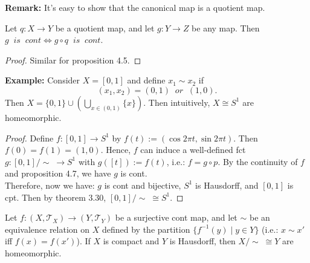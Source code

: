 \noindent\textbf{Remark:} It's easy to show that the canonical map is a quotient map.

\begin{proposition}
    Let $q: X \rightarrow Y$ be a quotient map, and let $g: Y \rightarrow Z$ be any map. Then
    $g \;\; is\;\; cont \Leftrightarrow g\circ q \;\; is \;\; cont.$
\end{proposition}

\begin{proof}
    Similar for proposition 4.5.
\end{proof}

\noindent\textbf{Example:} Consider $X = [0,1]$ and define $x_1\sim x_2$ if
$$(x_1,x_2) = (0,1) \;\; or \;\; (1,0).$$
Then $X= \{0,1\} \cup (\bigcup _{x\in (0,1)} \{ x\})$. Then intuitively, $X \cong S^1$ are homeomorphic.
\begin{proof}
    Define $f : [0,1] \rightarrow S^1$ by $f(t) := (\cos 2\pi t , \sin2\pi t)$. Then $f(0) = f(1) = (1,0)$. Hence, $f$ can induce a well-defined fct $g: [0,1] / \sim \;\rightarrow S^1$ with $g([t]) := f(t)$, i.e.: $f= g\circ p$. By the continuity of $f$ and proposition 4.7, we have $g$ is cont.\\
    Therefore, now we have: $g$ is cont and bijective, $S^1$ is Hausdorff, and $[0,1]$ is cpt. Then by theorem 3.30, $[0,1] / \sim \; \cong S^1$.
\end{proof}

\begin{proposition}
    Let $f: (X,\mathcal{T}_X) \rightarrow(Y,\mathcal{T}_Y)$ be a surjective cont map, and let $\sim$ be an equivalence relation on $X$ defined by the partition $\{ f^{-1} (y) \mid y \in Y\}$ (i.e.: $x\sim x'$ iff $f(x) = f(x')$). If $X$ is compact and $Y$ is Hausdorff, then $X/\sim \; \cong Y$ are homeomorphic.
\end{proposition}


